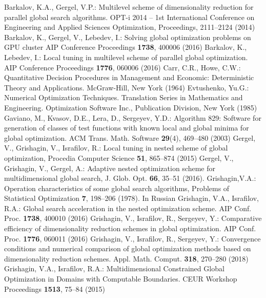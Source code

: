 \begin{thebibliography}{99.}
 Barkalov, K.A., Gergel, V.P.: Multilevel scheme of dimensionality reduction for parallel global search algorithms.  OPT-i 2014 -- 1st International Conference on Engineering and Applied Sciences Optimization, Proceedings, 2111--2124 (2014)
 Barkalov, K., Gergel, V., Lebedev, I.: Solving global optimization problems on GPU cluster  AIP Conference Proceedings \textbf{1738}, 400006 (2016)
 Barkalov, K., Lebedev, I.: Local tuning in multilevel scheme of parallel global optimization.  AIP Conference Proceedings \textbf{1776}, 060006 (2016)
	Carr, C.R., Howe, C.W.: Quantitative Decision Procedures in Management and Economic: Deterministic Theory and Applications. McGraw-Hill, New York (1964)
	Evtushenko, Yu.G.: Numerical Optimization Techniques. Translation Series in Mathematics and Engineering. Optimization Software  Inc., Publication Division, New York (1985)
 Gaviano, M., Kvasov, D.E., Lera, D., Sergeyev, Y.D.: Algorithm 829: Software for generation of classes of test functions with known local and global minima for global optimization. ACM Trans. Math. Software \textbf{29}(4), 469–480 (2003)
 Gergel, V.,  Grishagin, V., Israfilov, R.: Local tuning in nested scheme of global optimization, Procedia Computer Science \textbf{51}, 865--874 (2015) 
	Gergel, V., Grishagin, V., Gergel, A.: Adaptive nested optimization scheme for multidimensional global search, J. Glob. Opt. \textbf{66}, 35–51 (2016).
  Grishagin,V.A.: Operation characteristics of some global search algorithms, Problems of Statistical Optimization \textbf{7},  198--206 (1978). In Russian
	Grishagin, V.A., Israfilov, R.A.: Global search acceleration in the nested optimization scheme. AIP Conf. Proc. \textbf{1738}, 400010 (2016)
 Grishagin, V., Israfilov, R., Sergeyev, Y.: Comparative efficiency of dimensionality reduction schemes in global optimization. AIP Conf. Proc. \textbf{1776}, 060011 (2016)
	Grishagin, V.,  Israfilov, R., Sergeyev, Y.: Convergence conditions and numerical comparison of global optimization methods based on dimensionality reduction schemes. Appl. Math.  Comput. \textbf{318}, 270--280 (2018)
Grishagin, V.A., Israfilov, R.A.: Multidimensional Constrained Global Optimization in Domains with Computable Boundaries. CEUR Workshop Proceedings \textbf{1513}, 75--84 (2015)

\end{thebibliography}
